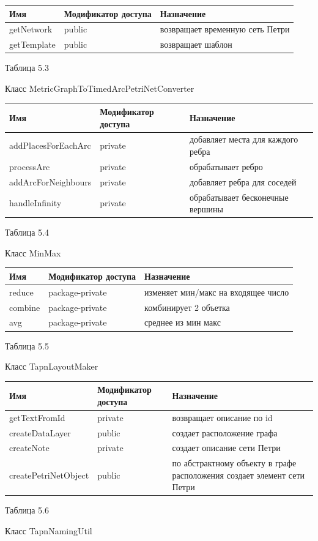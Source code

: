 \documentclass{../TechDoc}
\begin{document}
	\begin{tabular}{|p{5cm}|p{5cm}|p{5cm}|}
		\hline
		\textbf{Имя} & \textbf{Модификатор доступа} & \textbf{Назначение} \\
		\hline
		getNetwork & public & возвращает временную сеть Петри\\
		\hline
		getTemplate & public & возвращает шаблон\\
		\hline
	\end{tabular}
	\begin{flushright}
		Таблица 5.3
	\end{flushright}
	Класс MetricGraphToTimedArcPetriNetConverter
	
	\begin{tabular}{|p{5cm}|p{5cm}|p{5cm}|}
		\hline
		\textbf{Имя} & \textbf{Модификатор доступа} & \textbf{Назначение} \\
		\hline
		addPlacesForEachArc & private & добавляет места для каждого ребра\\
		\hline
		processArc & private & обрабатывает ребро\\
		\hline
		addArcForNeighbours & private & добавляет ребра для соседей\\
		\hline
		handleInfinity & private & обрабатывает бесконечные вершины\\
		\hline
		
	\end{tabular}
	\begin{flushright}
		Таблица 5.4
	\end{flushright}
	Класс MinMax
	
	\begin{tabular}{|p{5cm}|p{5cm}|p{5cm}|}
		\hline
		\textbf{Имя} & \textbf{Модификатор доступа} & \textbf{Назначение} \\
		\hline
		reduce & package-private & изменяет мин/макс на входящее число\\
		\hline
		combine & package-private & комбинирует 2 объетка\\
		\hline
		avg & package-private & среднее из мин макс\\
		\hline
	\end{tabular}
	\begin{flushright}
		Таблица 5.5
	\end{flushright}
	Класс TapnLayoutMaker
	
	\begin{tabular}{|p{5cm}|p{5cm}|p{5cm}|}
		\hline
		\textbf{Имя} & \textbf{Модификатор доступа} & \textbf{Назначение} \\
		\hline
		getTextFromId & private & возвращает описание по id\\
		\hline
		createDataLayer & public & создает расположение графа\\
		\hline
		createNote & private & создает описание сети Петри\\
		\hline
		createPetriNetObject& public & по абстрактному объекту в графе расположения создает элемент сети Петри\\
		
		\hline
	\end{tabular}
	\begin{flushright}
		Таблица 5.6
	\end{flushright}
	Класс TapnNamingUtil
	
\end{document}
